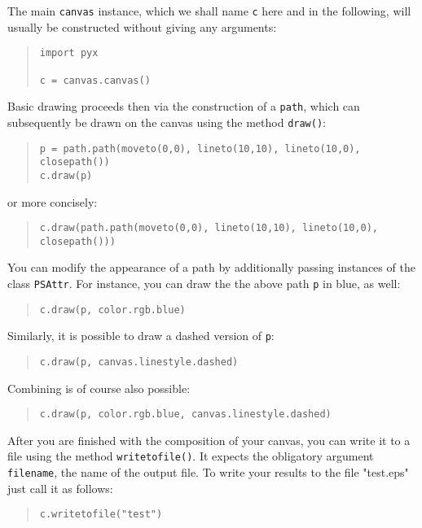 The main \verb|canvas| instance, which we shall name \verb|c| here and
in the following, will usually be constructed without giving any
arguments:
\begin{quote}
\begin{verbatim}
import pyx

c = canvas.canvas()
\end{verbatim}
\end{quote}
Basic drawing proceeds then via the construction of a \verb|path|, which 
can subsequently be drawn on the canvas using the method \verb|draw()|:
\begin{quote}
\begin{verbatim}
p = path.path(moveto(0,0), lineto(10,10), lineto(10,0), closepath())
c.draw(p)
\end{verbatim}
\end{quote}
or more concisely:
\begin{quote}
\begin{verbatim}
c.draw(path.path(moveto(0,0), lineto(10,10), lineto(10,0), closepath()))
\end{verbatim}
\end{quote}
You can modify the appearance of a path by additionally passing 
instances of the class \verb|PSAttr|. For instance, you can draw the 
the above path \verb|p| in blue, as well:
\begin{quote}
\begin{verbatim}
c.draw(p, color.rgb.blue)
\end{verbatim}
\end{quote}
Similarly, it is possible to draw a dashed version of \verb|p|:
\begin{quote}
\begin{verbatim}
c.draw(p, canvas.linestyle.dashed)
\end{verbatim}
\end{quote}
Combining is of course also possible:
\begin{quote}
\begin{verbatim}
c.draw(p, color.rgb.blue, canvas.linestyle.dashed)
\end{verbatim}
\end{quote}
After you are finished with the composition of your canvas, you can
write it to a file using the method \verb|writetofile()|. It expects the
obligatory argument \verb|filename|, the name of the output
file. To write your results to the file "test.eps" just call it as follows:
\begin{quote}
\begin{verbatim}
c.writetofile("test")
\end{verbatim}
\end{quote}


